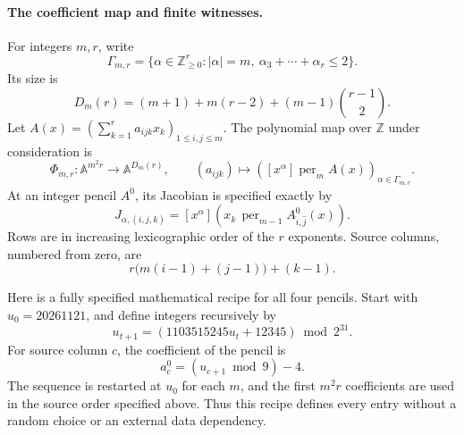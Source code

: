 \paragraph{The coefficient map and finite witnesses.}
For integers \(m,r\), write
\[
 \Gamma_{m,r}=\{\alpha\in\mathbb Z_{\geq0}^r:
              |\alpha|=m,\ \alpha_3+\cdots+\alpha_r\leq2\}.
\]
Its size is
\[
 D_m(r)=(m+1)+m(r-2)+(m-1)\binom{r-1}{2}.                       \tag{A-031.5}
\]
Let \(A(x)=(\sum_{k=1}^r a_{ijk}x_k)_{1\leq i,j\leq m}\).
The polynomial map over \(\mathbb Z\) under consideration is
\[
 \Phi_{m,r}:\mathbb A^{m^2r}\longrightarrow\mathbb A^{D_m(r)},
 \qquad
 (a_{ijk})\longmapsto
 ([x^\alpha]\operatorname{per}_m A(x))_{\alpha\in\Gamma_{m,r}}.
                                                               \tag{A-031.6}
\]
At an integer pencil \(A^0\), its Jacobian is specified exactly by
\[
 J_{\alpha,(i,j,k)}
     =[x^\alpha]\left(x_k\,
          \operatorname{per}_{m-1}A^0_{\widehat i,\widehat j}(x)
                    \right).                                  \tag{A-031.7}
\]
Rows are in increasing lexicographic order of the \(r\) exponents.
Source columns, numbered from zero, are
\[
                  r\bigl(m(i-1)+(j-1)\bigr)+(k-1).
\]

Here is a fully specified mathematical recipe for all four pencils.
Start with \(u_0=20261121\), and define integers recursively by
\[
 u_{t+1}=(1103515245u_t+12345)\bmod 2^{31}.
\]
For source column \(c\), the coefficient of the pencil is
\[
                        a^0_c=(u_{c+1}\bmod9)-4.
\]
The sequence is restarted at \(u_0\) for each \(m\), and the first
\(m^2r\) coefficients are used in the source order specified above.
Thus this recipe defines every entry without a random choice or
an external data dependency.

